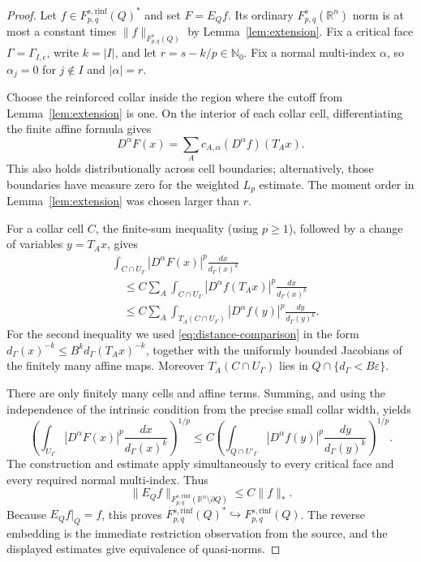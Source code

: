 \documentclass[11pt]{article}
\newcommand{\R}{\mathbb R}
\newcommand{\N}{\mathbb N}
\newcommand{\rinf}{\mathrm{rinf}}
\begin{document}
\begin{proof}
Let $f\in F_{p,q}^{s,\rinf}(Q)^*$ and set $F=E_Qf$.  Its ordinary
$F_{p,q}^s(\R^n)$ norm is at most a constant times
$\|f\|_{F_{p,q}^s(Q)}$ by Lemma~\ref{lem:extension}.  Fix a critical face
$\Gamma=\Gamma_{I,\epsilon}$, write $k=|I|$, and let
$r=s-k/p\in\N_0$.  Fix a normal multi-index $\alpha$, so
$\alpha_j=0$ for $j\notin I$ and $|\alpha|=r$.

Choose the reinforced collar inside the region where the cutoff from
Lemma~\ref{lem:extension} is one.  On the interior of each collar cell,
differentiating the finite affine formula gives
\begin{equation}\label{eq:derivative-sum}
 D^\alpha F(x)=\sum_A c_{A,\alpha}(D^\alpha f)(T_Ax).
\end{equation}
This also holds distributionally across cell boundaries; alternatively,
those boundaries have measure zero for the weighted $L_p$ estimate.  The
moment order in Lemma~\ref{lem:extension} was chosen larger than $r$.

For a collar cell $C$, the finite-sum inequality (using $p\ge1$), followed
by a change of variables $y=T_Ax$, gives
\begin{align*}
 &\int_{C\cap U_\Gamma}|D^\alpha F(x)|^p
          \frac{dx}{d_\Gamma(x)^k}\\
 &\quad\le C\sum_A\int_{C\cap U_\Gamma}
       |D^\alpha f(T_Ax)|^p\frac{dx}{d_\Gamma(x)^k}\\
 &\quad\le C\sum_A\int_{T_A(C\cap U_\Gamma)}
       |D^\alpha f(y)|^p\frac{dy}{d_\Gamma(y)^k}.
\end{align*}
For the second inequality we used
\eqref{eq:distance-comparison} in the form
$d_\Gamma(x)^{-k}\le B^k d_\Gamma(T_Ax)^{-k}$, together with the uniformly
bounded Jacobians of the finitely many affine maps.  Moreover
$T_A(C\cap U_\Gamma)$ lies in $Q\cap\{d_\Gamma<B\varepsilon\}$.

There are only finitely many cells and affine terms.  Summing, and using
the independence of the intrinsic condition from the precise small collar
width, yields
\begin{equation}\label{eq:weighted-bound}
 \left(\int_{U_\Gamma}|D^\alpha F(x)|^p
       \frac{dx}{d_\Gamma(x)^k}\right)^{1/p}
 \le C\left(\int_{Q\cap U'_\Gamma}|D^\alpha f(y)|^p
       \frac{dy}{d_\Gamma(y)^k}\right)^{1/p}.
\end{equation}
The construction and estimate apply simultaneously to every critical face
and every required normal multi-index.  Thus
\[
 \|E_Qf\|_{F_{p,q}^{s,\rinf}(\R^n\setminus\partial Q)}
 \le C\|f\|_*.
\]
Because $E_Qf|_Q=f$, this proves
$F_{p,q}^{s,\rinf}(Q)^*\hookrightarrow F_{p,q}^{s,\rinf}(Q)$.
The reverse embedding is the immediate restriction observation from the
source, and the displayed estimates give equivalence of quasi-norms.
\end{proof}
\end{document}
